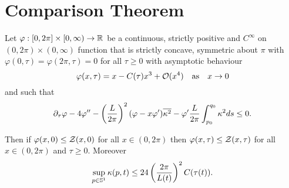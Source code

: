 \documentclass[a4paper, 12pt]{amsart}
\begin{document}
\section{Comparison Theorem}
\label{sec:comparison}

\begin{thm}
\label{thm:comparison}
Let \(\varphi : [0, 2\pi] \times [0, \infty) \to \R\) be a continuous, strictly positive and \(C^{\infty}\) on \((0, 2\pi) \times (0, \infty)\) function that is strictly concave, symmetric about \(\pi\) with \(\varphi(0, \tau) = \varphi(2\pi, \tau) = 0\) for all \(\tau \geq 0\) with asymptotic behaviour
\[
\varphi(x, \tau) = x - C(\tau) x^3 + \bigo(x^4)  \quad \text{as} \quad x \to 0
\]
and such that
\[
\partial_{\tau} \varphi - 4 \varphi'' - \left(\frac{L}{2\pi}\right)^2 (\varphi - x \varphi') \avg{\kappa^2} - \varphi' \frac{L}{2\pi} \int_{p_0}^{q_0} \kappa^2 ds \leq 0.
\]

Then if \(\varphi (x, 0) \leq \chordarcprofile(x, 0)\) for all \(x \in (0, 2\pi)\) then \(\varphi (x, \tau) \leq \chordarcprofile(x, \tau)\) for all \(x \in (0, 2\pi)\) and \(\tau \geq 0\). Moreover
\[
\sup_{p \in \S^1} \kappa(p, t) \leq 24\left(\frac{2\pi}{L(t)}\right)^2 C(\tau(t)).
\]
\end{thm}
\end{document}

